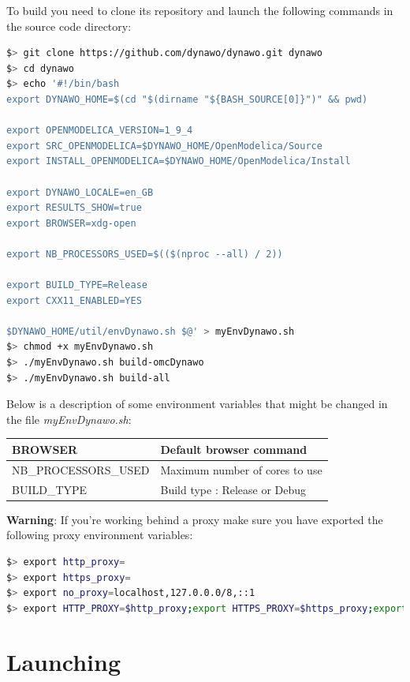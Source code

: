 \documentclass[a4paper, 12pt]{report}
\begin{document}
To build \Dynawo you need to clone its repository and launch the following commands in the source code directory:

\begin{lstlisting}[language=bash]
$> git clone https://github.com/dynawo/dynawo.git dynawo
$> cd dynawo
$> echo '#!/bin/bash
export DYNAWO_HOME=$(cd "$(dirname "${BASH_SOURCE[0]}")" && pwd)

export OPENMODELICA_VERSION=1_9_4
export SRC_OPENMODELICA=$DYNAWO_HOME/OpenModelica/Source
export INSTALL_OPENMODELICA=$DYNAWO_HOME/OpenModelica/Install

export DYNAWO_LOCALE=en_GB
export RESULTS_SHOW=true
export BROWSER=xdg-open

export NB_PROCESSORS_USED=$(($(nproc --all) / 2))

export BUILD_TYPE=Release
export CXX11_ENABLED=YES

$DYNAWO_HOME/util/envDynawo.sh $@' > myEnvDynawo.sh
$> chmod +x myEnvDynawo.sh
$> ./myEnvDynawo.sh build-omcDynawo
$> ./myEnvDynawo.sh build-all
\end{lstlisting}

Below is a description of some environment variables that might be changed in the file \textit{myEnvDynawo.sh}:

\begin{center}
\begin{tabular}{|l|l|}
  \hline
   BROWSER & Default browser command \\
  \hline
   NB\_PROCESSORS\_USED & Maximum number of cores to use \\
  \hline
   BUILD\_TYPE & Build type : Release or Debug \\
  \hline
\end{tabular}
\end{center}

\textbf{Warning}: If you're working behind a proxy make sure you have exported the following proxy environment variables:

\begin{lstlisting}[language=bash]
$> export http_proxy=
$> export https_proxy=
$> export no_proxy=localhost,127.0.0.0/8,::1
$> export HTTP_PROXY=$http_proxy;export HTTPS_PROXY=$https_proxy;export NO_PROXY=$no_proxy;
\end{lstlisting}

\section{Launching \Dynawo}
\end{document}
